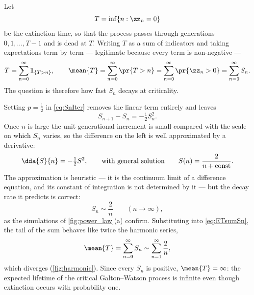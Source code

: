 Let
\begin{equation*}
T = \inf\{n : \zz_n=0\}
\end{equation*}
be the extinction time, so that the process passes through generations $0,1,\dots,T-1$
and is dead at $T$. Writing $T$ as a sum of indicators and taking expectations term by
term --- legitimate because every term is non-negative ---
\begin{equation}
\label{eq:ETsumSn}
T = \sum_{n=0}^{\infty}\mathbf{1}_{\{T>n\}},
\qquad
\mean{T} = \sum_{n=0}^{\infty}\pr{T>n} = \sum_{n=0}^{\infty}\pr{\zz_n>0} = \sum_{n=0}^{\infty}S_n .
\end{equation}
The question is therefore how fast $S_n$ decays at criticality.

Setting $p=\tfrac12$ in \cref{eq:SnIter} removes the linear term entirely and leaves
\begin{equation*}
S_{n+1}-S_n = -\tfrac12 S_n^2 .
\end{equation*}
Once $n$ is large the unit generational increment is small compared with the scale on
which $S_n$ varies, so the difference on the left is well approximated by a derivative:
\begin{equation*}
\dda{S}{n} = -\tfrac12 S^2,
\qquad\text{with general solution}\qquad
S(n) = \frac{2}{n+\text{const}} .
\end{equation*}
The approximation is heuristic --- it is the continuum limit of a difference equation,
and its constant of integration is not determined by it --- but the decay rate it
predicts is correct:
\begin{equation}
\label{eq:twoovrn}
S_n \sim \frac{2}{n}\qquad(n\to\infty),
\end{equation}
as the simulations of \cref{fig:power_law}(a) confirm. Substituting into
\cref{eq:ETsumSn}, the tail of the sum behaves like twice the harmonic series,
\begin{equation*}
\mean{T} = \sum_{n=0}^{\infty}S_n \sim \sum_{n=1}^{\infty}\frac{2}{n},
\end{equation*}
which diverges (\cref{fig:harmonic}). Since every $S_n$ is positive, $\mean{T}=\infty$:
the expected lifetime of the critical Galton--Watson process is infinite even though
extinction occurs with probability one.

